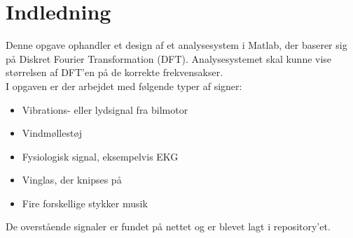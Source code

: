 \chapter{Indledning}\label{ch:introduction}
Denne opgave ophandler et design af et analysesystem i Matlab, der baserer sig på Diskret Fourier Transformation (DFT). 
Analysesystemet skal kunne vise størrelsen af DFT'en på de korrekte frekvensakser.
\\I opgaven er der arbejdet med følgende typer af signer:

\begin{itemize}
	\item Vibrations- eller lydsignal fra bilmotor
	\item Vindmøllestøj
	\item Fysiologisk signal, eksempelvis EKG
	\item Vinglas, der knipses på
	\item Fire forskellige stykker musik	
\end{itemize}

De overstående signaler er fundet på nettet og er blevet lagt i repository'et.